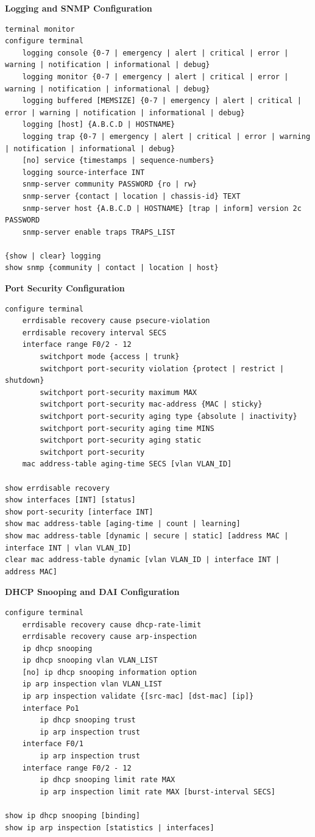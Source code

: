 \documentclass[12pt]{article}
\begin{document}
	\textbf{Logging and SNMP Configuration}
	\begin{lstlisting}
terminal monitor
configure terminal
	logging console {0-7 | emergency | alert | critical | error | warning | notification | informational | debug}
	logging monitor {0-7 | emergency | alert | critical | error | warning | notification | informational | debug}
	logging buffered [MEMSIZE] {0-7 | emergency | alert | critical | error | warning | notification | informational | debug}
	logging [host] {A.B.C.D | HOSTNAME}
	logging trap {0-7 | emergency | alert | critical | error | warning | notification | informational | debug}
	[no] service {timestamps | sequence-numbers}
	logging source-interface INT
	snmp-server community PASSWORD {ro | rw}
	snmp-server {contact | location | chassis-id} TEXT
	snmp-server host {A.B.C.D | HOSTNAME} [trap | inform] version 2c PASSWORD
	snmp-server enable traps TRAPS_LIST

{show | clear} logging
show snmp {community | contact | location | host}
	\end{lstlisting}

	\textbf{Port Security Configuration}
	\begin{lstlisting}
configure terminal
	errdisable recovery cause psecure-violation
	errdisable recovery interval SECS
	interface range F0/2 - 12
		switchport mode {access | trunk}
		switchport port-security violation {protect | restrict | shutdown}
		switchport port-security maximum MAX
		switchport port-security mac-address {MAC | sticky}
		switchport port-security aging type {absolute | inactivity}
		switchport port-security aging time MINS
		switchport port-security aging static
		switchport port-security
	mac address-table aging-time SECS [vlan VLAN_ID]

show errdisable recovery
show interfaces [INT] [status]
show port-security [interface INT]
show mac address-table [aging-time | count | learning]
show mac address-table [dynamic | secure | static] [address MAC | interface INT | vlan VLAN_ID]
clear mac address-table dynamic [vlan VLAN_ID | interface INT | address MAC]
	\end{lstlisting}

	\textbf{DHCP Snooping and DAI Configuration}
	\begin{lstlisting}
configure terminal
	errdisable recovery cause dhcp-rate-limit
	errdisable recovery cause arp-inspection
	ip dhcp snooping
	ip dhcp snooping vlan VLAN_LIST
	[no] ip dhcp snooping information option
	ip arp inspection vlan VLAN_LIST
	ip arp inspection validate {[src-mac] [dst-mac] [ip]}
	interface Po1
		ip dhcp snooping trust
		ip arp inspection trust
	interface F0/1
		ip arp inspection trust
	interface range F0/2 - 12
		ip dhcp snooping limit rate MAX
		ip arp inspection limit rate MAX [burst-interval SECS]

show ip dhcp snooping [binding]
show ip arp inspection [statistics | interfaces]
	\end{lstlisting}
\end{document}
